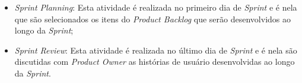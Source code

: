 \begin{itemize}
    \item \textit{Sprint Planning}: Esta atividade é realizada no primeiro dia de \textit{Sprint} e é nela que são selecionados os itens do \textit{Product Backlog} que serão desenvolvidos ao longo da \textit{Sprint};
    \item \textit{Sprint Review}: Esta atividade é realizada no último dia de \textit{Sprint} e é nela são discutidas com \textit{Product Owner} as histórias de usuário desenvolvidas ao longo da \textit{Sprint}.   
\end{itemize}